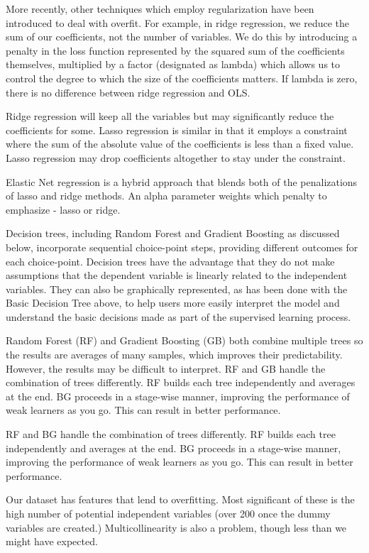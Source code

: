 \documentclass[
]{article}
\begin{document}
More recently, other techniques which employ regularization have been
introduced to deal with overfit. For example, in ridge regression, we
reduce the sum of our coefficients, not the number of variables. We do
this by introducing a penalty in the loss function represented by the
squared sum of the coefficients themselves, multiplied by a factor
(designated as lambda) which allows us to control the degree to which
the size of the coefficients matters. If lambda is zero, there is no
difference between ridge regression and OLS.

Ridge regression will keep all the variables but may significantly
reduce the coefficients for some. Lasso regression is similar in that it
employs a constraint where the sum of the absolute value of the
coefficients is less than a fixed value. Lasso regression may drop
coefficients altogether to stay under the constraint.

Elastic Net regression is a hybrid approach that blends both of the
penalizations of lasso and ridge methods. An alpha parameter weights
which penalty to emphasize - lasso or ridge.

Decision trees, including Random Forest and Gradient Boosting as
discussed below, incorporate sequential choice-point steps, providing
different outcomes for each choice-point. Decision trees have the
advantage that they do not make assumptions that the dependent variable
is linearly related to the independent variables. They can also be
graphically represented, as has been done with the Basic Decision Tree
above, to help users more easily interpret the model and understand the
basic decisions made as part of the supervised learning process.

Random Forest (RF) and Gradient Boosting (GB) both combine multiple
trees so the results are averages of many samples, which improves their
predictability. However, the results may be difficult to interpret. RF
and GB handle the combination of trees differently. RF builds each tree
independently and averages at the end. BG proceeds in a stage-wise
manner, improving the performance of weak learners as you go. This can
result in better performance.

RF and BG handle the combination of trees differently. RF builds each
tree independently and averages at the end. BG proceeds in a stage-wise
manner, improving the performance of weak learners as you go. This can
result in better performance.

Our dataset has features that lend to overfitting. Most significant of
these is the high number of potential independent variables (over 200
once the dummy variables are created.) Multicollinearity is also a
problem, though less than we might have expected.
\end{document}
